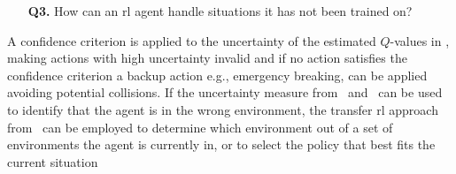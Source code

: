 \begin{enumerate}
	\item[\textbf{Q3.}] How can an \gls{rl} agent handle situations it has not been trained on? 
\end{enumerate}
A confidence criterion is applied to the uncertainty of the estimated $Q$-values in \paperEnsamble, making actions with high uncertainty invalid and if no action satisfies the confidence criterion a backup action e.g., emergency breaking, can be applied avoiding potential collisions. If the uncertainty measure from \paperEnsamble \ and \paperBelief \ can be used to identify that the agent is in the wrong environment, the transfer \gls{rl} approach from \paperTransfer \ can be employed to determine which environment out of a set of environments the agent is currently in, or to select the policy that best fits the current situation



	
